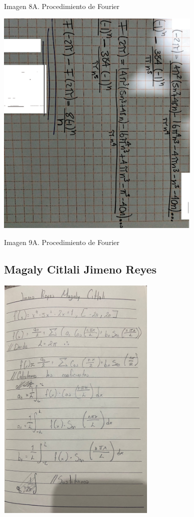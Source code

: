 Imagen 8A. Procedimiento de Fourier

\includegraphics[width=3.88021in,height=4.37099in]{media/image43.png}

Imagen 9A. Procedimiento de Fourier

\subsection{Magaly Citlali Jimeno Reyes}

\includegraphics[width=2.98958in,height=4.74434in]{media/image13.jpg}

